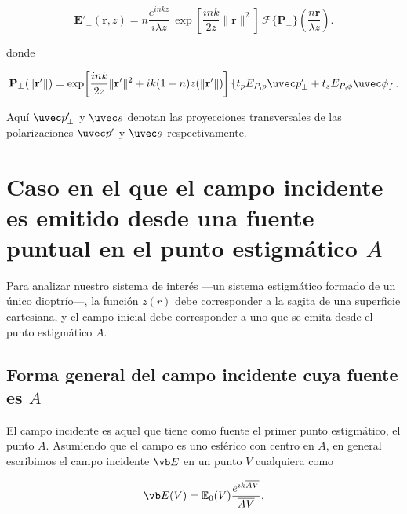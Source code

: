 \begin{equation}
\mathbf{E}'_\perp(\mathbf r,z)
=
n\frac{e^{inkz}}{i\lambda z}\,
\exp\!\left[
\frac{ink}{2z}\|\mathbf r\|^2
\right]
\,
\mathscr F\{\mathbf P_\perp\}
\left(
\frac{n\mathbf r}{\lambda z}
\right).
\label{eq:E_field_as_FT}
\end{equation}

donde

\begin{equation}
\mathbf P_\perp(\|\mathbf r'\|)
=
\exp\!\left[
\frac{ink}{2z}\|\mathbf r'\|^2
+
ik(1-n)z(\|\mathbf r'\|)
\right]
\left\{
t_p E_{P,p} \uvec p'_\perp
+
t_s E_{P,\phi} \uvec \phi
\right\}.
\end{equation}

Aquí $\uvec p'_\perp$ y $\uvec s$ denotan las proyecciones transversales de las polarizaciones $\uvec p'$ y $\uvec s$ respectivamente.

\section{Caso en el que el campo incidente es emitido desde una fuente puntual en el punto estigmático $A$}

Para analizar nuestro sistema de interés ---un sistema estigmático formado de un único dioptrío---, la función $z(r)$ debe corresponder a la sagita de una superficie cartesiana, y el campo inicial debe corresponder a uno que se emita desde el punto estigmático $A$.

\subsection{Forma general del campo incidente cuya fuente es $A$}

El campo incidente es aquel que tiene como fuente el primer punto estigmático, el punto $A$. Asumiendo que el campo es uno esférico con centro en $A$, en general escribimos el campo incidente $\vb E$ en un punto $V$ cualquiera como

\begin{equation}
  \vb E (V)
  =
  \mathbb{E}_0(V)
  \frac{e^{ik\overline{AV}}}{\overline{AV}},
  \label{eq:initial_field}
\end{equation}

